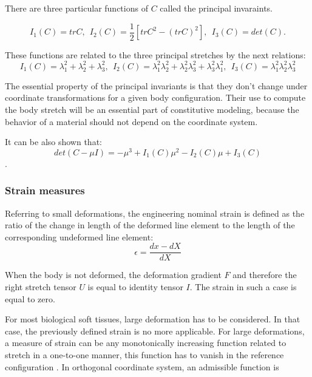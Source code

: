 There are three particular functions of $C$ called the principal invaraints. 

\begin{equation}
\label{principal_invariants}
I_1(C) = tr C, \ \ I_2(C)=\frac{1}{2}\left[ trC^2 - \left(tr C \right)^2 \right], \ \ I_3(C)=det(C) .
\end{equation} 

These functions are related to the three principal stretches by the next relations:
\begin{equation}
\label{principalstrechinvariantsrelation}
I_1(C) = \lambda_1^2+\lambda_2^2+\lambda_3^2, \ \ I_2(C) = \lambda_1^2 \lambda_2^2 + \lambda_2^2 \lambda_3^2+ \lambda_3^2 \lambda_1^2, \ \ I_3(C) = \lambda_1^2 \lambda_2^2 \lambda_3^2
\end{equation}

The essential property of the principal invariants is that they don't change under coordinate transformations for a given body configuration. Their use to compute the body stretch will be an essential part of constitutive modeling, because the behavior of a material should not depend on the coordinate system.

It can be also shown that:
\begin{equation}
\label{eq:detinvariantrelation}
det(C-\mu I) = -\mu ^3+I_1(C)\mu ^2-I_2(C)\mu +I_3(C)
\end{equation}. 



\subsubsection*{Strain measures}\label{strainmeasure}
Referring to small deformations, the engineering nominal strain is defined as the ratio of the change in length of the deformed line element to the length of the corresponding undeformed line element:  
\begin{equation}
\epsilon = \frac{ dx  - dX }{	dX }
\end{equation}

When the body is not deformed, the deformation gradient $F$ and therefore the right stretch tensor $U$ is equal to identity tensor $I$. The strain in such a case is equal to zero. 

For most biological soft tissues, large deformation has to be considered. In that case, the previously defined strain is no more applicable. For large deformations, a measure of strain can be any monotonically increasing function related to stretch in a one-to-one manner, this function has to vanish in the reference configuration \citep{mcmeeking_finite_1975}. In orthogonal coordinate system, an admissible function is  

